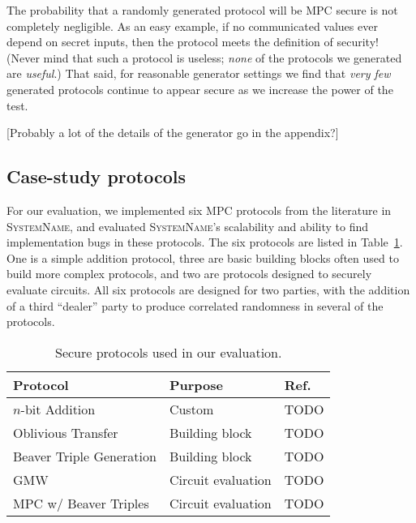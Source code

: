 \documentclass[conference]{IEEEtran}
\newcommand{\system}{\textsc{SystemName}\xspace}
\begin{document}
The probability that a randomly generated protocol will be MPC secure is not completely negligible.
As an easy example, if no communicated values ever depend on secret inputs, then the protocol meets the definition of security!
(Never mind that such a protocol is useless; \textit{none} of the protocols we generated are \textit{useful}.)
That said, for reasonable generator settings we find that \textit{very few} generated protocols
continue to appear secure as we increase the power of the test.

[Probably a lot of the details of the generator go in the appendix?]



\subsection{Case-study protocols}
\label{sec:case-study-protocols}

For our evaluation, we implemented six MPC protocols from the literature in \system, and evaluated \system's scalability and ability to find implementation bugs in these protocols. The six protocols are listed in Table~\ref{tbl:protocols}. One is a simple addition protocol, three are basic building blocks often used to build more complex protocols, and two are protocols designed to securely evaluate circuits. All six protocols are designed for two parties, with the addition of a third ``dealer'' party to produce correlated randomness in several of the protocols.

\begin{table}
\centering
  \begin{tabular}{|l | l|l|}
    \hline
    \textbf{Protocol} & \textbf{Purpose} & \textbf{Ref.} \\
    \hline
    $n$-bit Addition & Custom & TODO \\
    Oblivious Transfer & Building block & TODO \\
    Beaver Triple Generation & Building block & TODO \\
    GMW & Circuit evaluation & TODO \\
    MPC w/ Beaver Triples & Circuit evaluation & TODO \\
    \hline
  \end{tabular}
  \caption{Secure protocols used in our evaluation.}
  \label{tbl:protocols}
\end{table}
\end{document}
